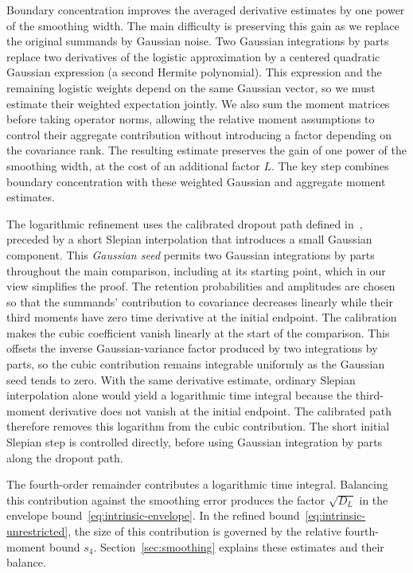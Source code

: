 \documentclass[11pt,letterpaper]{article}
\theoremstyle{remark}
\begin{document}
{Boundary concentration improves the averaged
derivative estimates by one power of the smoothing width. The main
difficulty is preserving this gain as we replace the original summands
by Gaussian noise. Two Gaussian integrations by parts replace two
derivatives of the logistic approximation by a centered quadratic
Gaussian expression (a second Hermite polynomial). This expression and
the remaining logistic weights depend on the same Gaussian vector, so
we must estimate their weighted expectation jointly. We also sum the
moment matrices before taking operator norms, allowing the relative
moment assumptions to control their aggregate contribution without
introducing a factor depending on the covariance rank. The resulting
estimate preserves the gain of one power of the smoothing width, at
the cost of an additional factor \(L\). The key step combines boundary
concentration with these weighted Gaussian and aggregate moment
estimates.}

The logarithmic refinement uses the calibrated dropout path defined
in~\cite[Section~4]{AL}, preceded by a short Slepian interpolation that
introduces a small Gaussian component. {This
\emph{Gaussian seed} permits two Gaussian integrations by parts throughout
the main comparison, including at its starting point, which in our view
simplifies the proof.} The retention probabilities
and amplitudes are chosen so that the summands' contribution to covariance
decreases linearly while their third moments have zero time derivative
at the initial endpoint. {The calibration makes the cubic
coefficient vanish linearly at the start of the comparison. This offsets
the inverse Gaussian-variance factor produced by two integrations by
parts, so the cubic contribution remains integrable uniformly as the
Gaussian seed tends to zero.} {With the same derivative estimate, ordinary
Slepian interpolation alone would yield a logarithmic time integral because the
third-moment derivative does not vanish at the initial endpoint.} The calibrated path therefore removes this
logarithm from the cubic contribution. The short initial Slepian step
is controlled directly, before using Gaussian integration by parts
along the dropout path.

{The fourth-order remainder contributes a logarithmic time integral.
Balancing this contribution against the smoothing error produces the
factor \(\sqrt{D_L}\) in the envelope bound~\eqref{eq:intrinsic-envelope}.
In the refined bound~\eqref{eq:intrinsic-unrestricted}, the size of this
contribution is governed by the relative fourth-moment bound \(s_4\).
Section~\ref{sec:smoothing} explains these estimates and their balance.}
\end{document}
